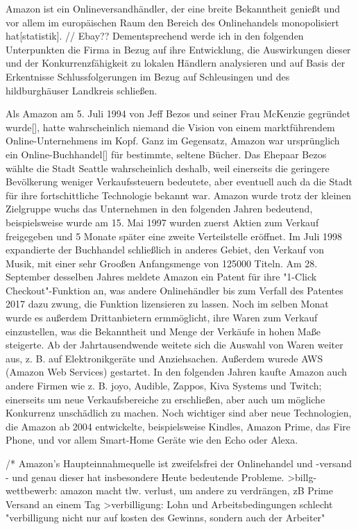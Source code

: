 
Amazon ist ein Onlineversandhändler, der eine breite Bekanntheit genießt und vor allem im europäischen Raum den Bereich des Onlinehandels monopolisiert hat[statistik]. // Ebay??
Dementsprechend werde ich in den folgenden Unterpunkten die Firma in Bezug auf ihre Entwicklung, die Auswirkungen dieser und der Konkurrenzfähigkeit zu lokalen Händlern analysieren und auf Basis der Erkentnisse Schlussfolgerungen im Bezug auf Schleusingen und des hildburghäuser Landkreis schließen.

Als Amazon am 5. Juli 1994 von Jeff Bezos und seiner Frau McKenzie gegründet wurde[], hatte wahrscheinlich niemand die Vision von einem marktführendem Online-Unternehmens im Kopf. 
Ganz im Gegensatz, Amazon war ursprünglich ein Online-Buchhandel[] für bestimmte, seltene Bücher.
Das Ehepaar Bezos wählte die Stadt Seattle wahrscheinlich deshalb, weil einerseits die geringere Bevölkerung weniger Verkaufssteuern bedeutete, aber eventuell auch da die Stadt für ihre fortschittliche Technologie bekannt war.
Amazon wurde trotz der kleinen Zielgruppe wuchs das Unternehmen in den folgenden Jahren bedeutend, beispielsweise wurde am 15. Mai 1997 wurden zuerst Aktien zum Verkauf freigegeben und 5 Monate später eine zweite Verteilstelle eröffnet.
Im Juli 1998 expandierte der Buchhandel schließlich in anderes Gebiet, den Verkauf von Musik, mit einer sehr Grooßen Anfangsmenge von 125000 Titeln. 
Am 28. September desselben Jahres meldete Amazon ein Patent für ihre "1-Click Checkout"-Funktion an, was andere Onlinehändler bis zum Verfall des Patentes 2017 dazu zwung, die Funktion lizensieren zu lassen.
Noch im selben Monat wurde es außerdem Drittanbietern ermmöglicht, ihre Waren zum Verkauf einzustellen, was die Bekanntheit und Menge der Verkäufe in hohen Maße steigerte.
Ab der Jahrtausendwende weitete sich die Auswahl von Waren weiter aus, z. B. auf Elektronikgeräte und Anziehsachen. Außerdem wurede AWS (Amazon Web Services) gestartet.
In den folgenden Jahren kaufte Amazon auch andere Firmen wie z. B. joyo, Audible, Zappos, Kiva Systems und Twitch; einerseits um neue Verkaufsbereiche zu erschließen, aber auch um mögliche Konkurrenz unschädlich zu machen.
Noch wichtiger sind aber neue Technologien, die Amazon ab 2004 entwickelte, beispielsweise Kindles, Amazon Prime, das Fire Phone, und vor allem Smart-Home Geräte wie den Echo oder Alexa.

/*
Amazon's Haupteinnahmequelle ist zweifelsfrei der Onlinehandel und -versand - und genau dieser hat insbesondere Heute bedeutende Probleme. 
  >billg-wettbewerb: amazon macht tlw. verlust, um andere zu verdrängen, zB Prime Versand an einem Tag
  >verbilligung: Lohn und Arbeitsbedingungen schlecht "verbilligung nicht nur auf kosten des Gewinns, sondern auch der Arbeiter"




